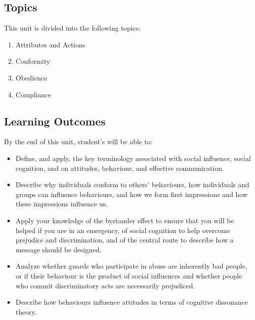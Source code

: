 \documentclass[
]{book}
\providecommand{\tightlist}{%
  \setlength{\itemsep}{0pt}\setlength{\parskip}{0pt}}
\begin{document}
\hypertarget{topics-4}{%
\subsection*{Topics}\label{topics-4}}

This unit is divided into the following topics:

\begin{enumerate}
\def\labelenumi{\arabic{enumi}.}
\tightlist
\item
  Attributes and Actions\\
\item
  Conformity\\
\item
  Obedience\\
\item
  Compliance
\end{enumerate}

\hypertarget{learning-outcomes-4}{%
\subsection*{Learning Outcomes}\label{learning-outcomes-4}}

By the end of this unit, student's will be able to:

\begin{itemize}
\tightlist
\item
  Define, and apply, the key terminology associated with social influence, social cognition, and on attitudes, behaviour, and effective communication.\\
\item
  Describe why individuals conform to others' behaviours, how individuals and groups can influence behaviours, and how we form first impressions and how these impressions influence us.\\
\item
  Apply your knowledge of the bystander effect to ensure that you will be helped if you are in an emergency, of social cognition to help overcome prejudice and discrimination, and of the central route to describe how a message should be designed.\\
\item
  Analyze whether guards who participate in abuse are inherently bad people, or if their behaviour is the product of social influences and whether people who commit discriminatory acts are necessarily prejudiced.\\
\item
  Describe how behaviours influence attitudes in terms of cognitive dissonance theory.
\end{itemize}
\end{document}
